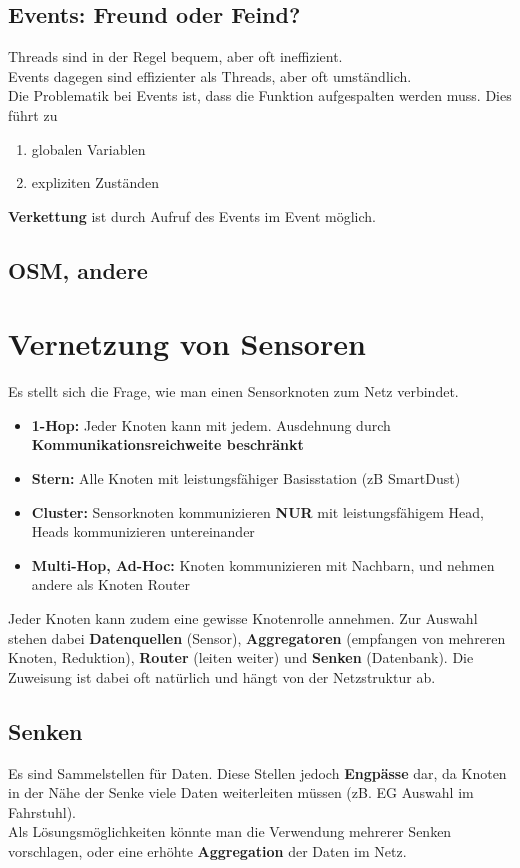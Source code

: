 \documentclass[a4paper]{article}
\begin{document}
\subsection{Events: Freund oder Feind?}
Threads sind in der Regel bequem, aber oft ineffizient.\\
Events dagegen sind effizienter als Threads, aber oft umständlich.\\

Die Problematik bei Events ist, dass die Funktion aufgespalten werden muss. Dies führt zu
\begin{enumerate}
	\item globalen Variablen
	\item expliziten Zuständen
\end{enumerate}
\textbf{Verkettung} ist durch Aufruf des Events im Event möglich.
\subsection{OSM, andere}

\section{Vernetzung von Sensoren}
Es stellt sich die Frage, wie man einen Sensorknoten zum Netz verbindet.
\begin{itemize}
	\item \textbf{1-Hop:} Jeder Knoten kann mit jedem. Ausdehnung durch \textbf{Kommunikationsreichweite beschränkt}
	\item \textbf{Stern:} Alle Knoten mit leistungsfähiger Basisstation (zB SmartDust)
	\item \textbf{Cluster:} Sensorknoten kommunizieren \textbf{NUR} mit leistungsfähigem Head, Heads kommunizieren untereinander
	\item \textbf{Multi-Hop, Ad-Hoc:} Knoten kommunizieren mit Nachbarn, und nehmen andere als Knoten Router
\end{itemize}
Jeder Knoten kann zudem eine gewisse Knotenrolle annehmen. Zur Auswahl stehen dabei \textbf{Datenquellen} (Sensor), \textbf{Aggregatoren} (empfangen von mehreren Knoten, Reduktion), \textbf{Router} (leiten weiter) und \textbf{Senken} (Datenbank). Die Zuweisung ist dabei oft natürlich und hängt von der Netzstruktur ab.
\subsection{Senken}
Es sind Sammelstellen für Daten. Diese Stellen jedoch \textbf{Engpässe} dar, da Knoten in der Nähe der Senke viele Daten weiterleiten müssen (zB. EG Auswahl im Fahrstuhl).\\
Als Lösungsmöglichkeiten könnte man die Verwendung mehrerer Senken vorschlagen, oder eine erhöhte \textbf{Aggregation} der Daten im Netz.
\end{document}
